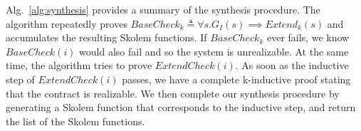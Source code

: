 Alg.~\ref{alg:synthesis} provides a summary of the synthesis
procedure. The algorithm repeatedly proves $\mathit{BaseCheck_k}
\triangleq \forall s. G_I(s) \implies \mathit{Extend}_k(s)$ and
accumulates the resulting Skolem functions. If
$\mathit{BaseCheck_k}$ ever fails, we know $\mathit{BaseCheck(i)}$
would also fail and so the system is unrealizable. At the same time,
the algorithm tries to prove $\mathit{ExtendCheck(i)}$. As soon as the
inductive step of $\mathit{ExtendCheck(i)}$ passes, we have a complete
k-inductive proof stating that the contract is realizable. We then
complete our synthesis procedure by generating a Skolem function that
corresponds to the inductive step, and return the list of the Skolem
functions.

\begin{figure}[t]
\begin{minipage}{0.65\textwidth}
\end{minipage}
\hspace{-0.8cm}
\begin{minipage}[t]{0.38\textwidth}
\end{minipage}
\end{figure}

